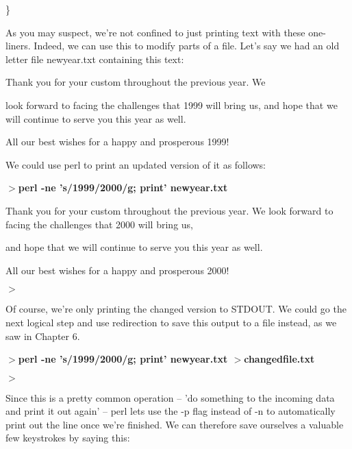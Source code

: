 \documentclass[a4paper,11pt]{book}
\begin{document}
\noindent \}

\noindent 

\noindent As you may suspect, we're not confined to just printing text with these one-liners. Indeed, we can use this to modify parts of a file. Let's say we had an old letter file newyear.txt containing this text:

\noindent 

\noindent Thank you for your custom throughout the previous year. We

\noindent look forward to facing the challenges that 1999 will bring us, and hope that we will continue to serve you this year as well.

\noindent 

\noindent All our best wishes for a happy and prosperous 1999!

\noindent 

\noindent We could use perl to print an updated version of it as follows:

\noindent 

\noindent $>$\textbf{perl -ne 's/1999/2000/g; print' newyear.txt}

\noindent Thank you for your custom throughout the previous year. We look forward to facing the challenges that 2000 will bring us,

\noindent and hope that we will continue to serve you this year as well.

\noindent 

\noindent All our best wishes for a happy and prosperous 2000!

\noindent $>$

\noindent 

\noindent Of course, we're only printing the changed version to STDOUT. We could go the next logical step and use redirection to save this output to a file instead, as we saw in Chapter 6.

\noindent 

\noindent $>$\textbf{perl -ne 's/1999/2000/g; print' newyear.txt $>$changedfile.txt}

\noindent $>$

\noindent 

\noindent Since this is a pretty common operation -- 'do something to the incoming data and print it out again' -- perl lets use the -p flag instead of -n to automatically print out the line once we're finished. We can therefore save ourselves a valuable few keystrokes by saying this:

\noindent 
\end{document}
